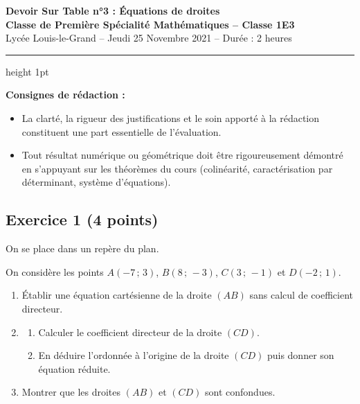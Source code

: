 \documentclass[11pt,a4paper]{article}
\begin{document}
\begin{center}
    {\LARGE \bfseries Devoir Sur Table n°3 : Équations de droites}\\[0.25cm]
    {\large \textbf{Classe de Première Spécialité Mathématiques -- Classe 1E3}}\\[0.15cm]
    {\small Lycée Louis-le-Grand -- Jeudi 25 Novembre 2021 -- Durée : 2 heures}\\[0.3cm]
    \hrule height 1pt
\end{center}

\vspace{0.3cm}

\begin{tcolorbox}[colback=gray!5!white,colframe=gray!60!black,arc=1.5mm,boxrule=0.6pt]
\textbf{Consignes de rédaction :}
\begin{itemize}[leftmargin=*,itemsep=1pt]
    \item La clarté, la rigueur des justifications et le soin apporté à la rédaction constituent une part essentielle de l'évaluation.
    \item Tout résultat numérique ou géométrique doit être rigoureusement démontré en s'appuyant sur les théorèmes du cours (colinéarité, caractérisation par déterminant, système d'équations).
\end{itemize}
\end{tcolorbox}

\vspace{0.3cm}

\subsection*{Exercice 1 \hfill \normalfont\normalsize (4 points)}

On se place dans un repère du plan.

On considère les points $A(-7\,;\,3)$, $B(8\,;\,-3)$, $C(3\,;\,-1)$ et $D(-2\,;\,1)$.

\begin{enumerate}
    \item Établir une équation cartésienne de la droite $(AB)$ sans calcul de coefficient directeur.
    \item 
    \begin{enumerate}
        \item Calculer le coefficient directeur de la droite $(CD)$.
        \item En déduire l'ordonnée à l'origine de la droite $(CD)$ puis donner son équation réduite.
    \end{enumerate}
    \item Montrer que les droites $(AB)$ et $(CD)$ sont confondues.
\end{enumerate}
\end{document}
